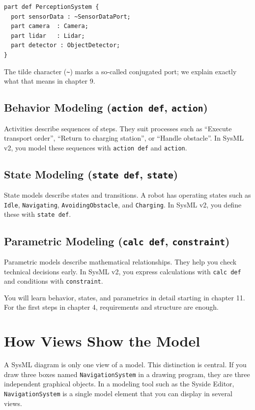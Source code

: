 \begin{lstlisting}
part def PerceptionSystem {
  port sensorData : ~SensorDataPort;
  part camera  : Camera;
  part lidar   : Lidar;
  part detector : ObjectDetector;
}
\end{lstlisting}

\begin{hinweisbox}
The tilde character (\texttt{\textasciitilde}) marks a so-called conjugated port; we explain exactly what that means in chapter 9.
\end{hinweisbox}

\subsection{Behavior Modeling (\texttt{action def}, \texttt{action})}
Activities describe sequences of steps. They suit processes such as \enquote{Execute transport order}, \enquote{Return to charging station}, or \enquote{Handle obstacle}. In SysML v2, you model these sequences with \texttt{action def} and \texttt{action}.

\subsection{State Modeling (\texttt{state def}, \texttt{state})}
State models describe states and transitions. A robot has operating states such as \texttt{Idle}, \texttt{Navigating}, \texttt{AvoidingObstacle}, and \texttt{Charging}. In SysML v2, you define these with \texttt{state def}.

\subsection{Parametric Modeling (\texttt{calc def}, \texttt{constraint})}
Parametric models describe mathematical relationships. They help you check technical decisions early. In SysML v2, you express calculations with \texttt{calc def} and conditions with \texttt{constraint}.

You will learn behavior, states, and parametrics in detail starting in chapter 11. For the first steps in chapter 4, requirements and structure are enough.

\section{How Views Show the Model}
A SysML diagram is only one view of a model. This distinction is central. If you draw three boxes named \texttt{NavigationSystem} in a drawing program, they are three independent graphical objects. In a modeling tool such as the Syside Editor, \texttt{NavigationSystem} is a single model element that you can display in several views.

